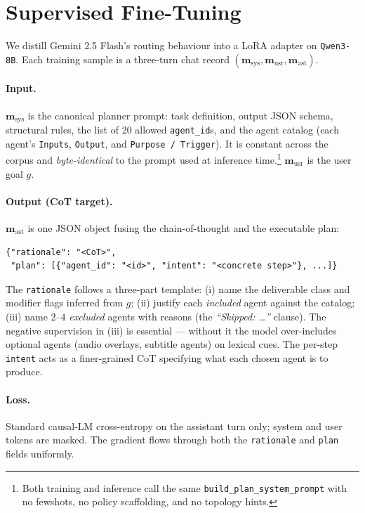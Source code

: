 \section{Supervised Fine-Tuning}
\label{sec:sft}

We distill Gemini 2.5 Flash's routing behaviour into a LoRA adapter on
\texttt{Qwen3-8B}. Each training sample is a three-turn chat
record $(\mathbf{m}_{\text{sys}}, \mathbf{m}_{\text{usr}}, \mathbf{m}_{\text{ast}})$.

\paragraph{Input.}
$\mathbf{m}_{\text{sys}}$ is the canonical planner prompt: task definition,
output JSON schema, structural rules, the list of $20$ allowed
\texttt{agent\_id}s, and the agent catalog (each agent's
\texttt{Inputs}, \texttt{Output}, and \texttt{Purpose / Trigger}).
It is constant across the corpus and \emph{byte-identical} to the
prompt used at inference time.\footnote{Both training and inference call
the same \texttt{build\_plan\_system\_prompt} with no fewshots, no
policy scaffolding, and no topology hints.}
$\mathbf{m}_{\text{usr}}$ is the user goal $g$.

\paragraph{Output (CoT target).}
$\mathbf{m}_{\text{ast}}$ is one JSON object fusing the chain-of-thought
and the executable plan:
\begin{lstlisting}[basicstyle=\ttfamily\footnotesize,breaklines=true,frame=single]
{"rationale": "<CoT>",
 "plan": [{"agent_id": "<id>", "intent": "<concrete step>"}, ...]}
\end{lstlisting}
The \texttt{rationale} follows a three-part template:
(i) name the deliverable class and modifier flags inferred from $g$;
(ii) justify each \emph{included} agent against the catalog;
(iii) name $2$--$4$ \emph{excluded} agents with reasons (the
\textit{``Skipped: \dots''} clause). The negative supervision in
(iii) is essential — without it the model over-includes optional
agents (audio overlays, subtitle agents) on lexical cues. The
per-step \texttt{intent} acts as a finer-grained CoT specifying what
each chosen agent is to produce.

\paragraph{Loss.}
Standard causal-LM cross-entropy on the assistant turn only;
system and user tokens are masked. The gradient flows through
both the \texttt{rationale} and \texttt{plan} fields uniformly.


